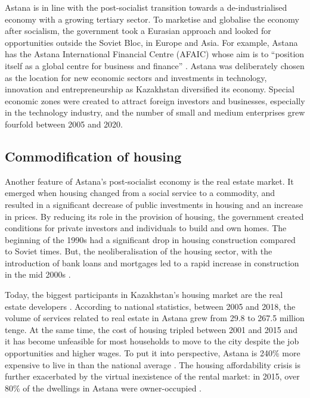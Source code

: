 \documentclass{article}
\begin{document}
Astana is in line with the post-socialist transition towards a de-industrialised economy with a growing tertiary sector. To marketise and globalise the economy after socialism, the government took a Eurasian approach and looked for opportunities outside the Soviet Bloc, in Europe and Asia. For example, Astana has the Astana International Financial Centre (AFAIC) whose aim is to ``position itself as a global centre for business and finance'' \parencite{aifc}. Astana was deliberately chosen as the location for new economic sectors and investments in technology, innovation and entrepreneurship as Kazakhstan diversified its economy. Special economic zones were created to attract foreign investors and businesses, especially in the technology industry, and the number of small and medium enterprises grew fourfold between 2005 and 2020.

\subsection{Commodification of housing}

Another feature of Astana's post-socialist economy is the real estate market. It emerged when housing changed from a social service to a commodity, and resulted in a significant decrease of public investments in housing and an increase in prices. 
By reducing its role in the provision of housing, the government created conditions for private investors and individuals to build and own homes. The beginning of the 1990s had a significant drop in housing construction compared to Soviet times. But, the neoliberalisation of the housing sector, with the introduction of bank loans and mortgages led to a rapid increase in construction in the mid 2000s \parencite{unece2018housing}.

Today, the biggest participants in Kazakhstan's housing market are the real estate developers \parencite{unece2018housing}. According to national statistics, between 2005 and 2018, the volume of services related to real estate in Astana grew from 29.8 to 267.5 million tenge.
At the same time, the cost of housing tripled between 2001 and 2015 \parencite{seitz2021urbanization} and it has become unfeasible for most households to move to the city despite the job opportunities and higher wages. To put it into perspective, Astana is 240\% more expensive to live in than the national average \parencite{seitz2021urbanization}. The housing affordability crisis is further exacerbated by the virtual inexistence of the rental market: in 2015, over 80\% of the dwellings in Astana were owner-occupied \parencite{seitz2021urbanization}.
\end{document}
